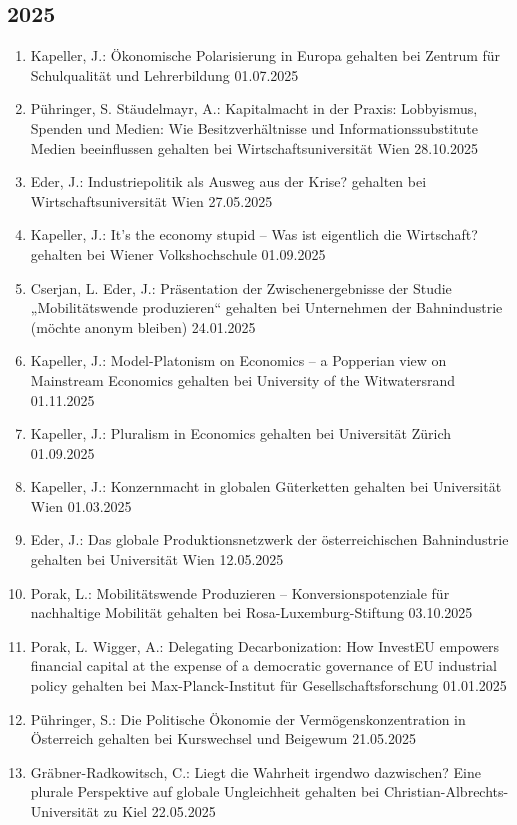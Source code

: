 \subsection*{2025}
\begin{enumerate}
	\item Kapeller, J.: Ökonomische Polarisierung in Europa gehalten bei Zentrum für Schulqualität und Lehrerbildung 01.07.2025
	\item Pühringer, S. Stäudelmayr, A.: Kapitalmacht in der Praxis: Lobbyismus, Spenden und Medien: Wie Besitzverhältnisse und Informationssubstitute Medien beeinflussen gehalten bei Wirtschaftsuniversität Wien 28.10.2025
	\item Eder, J.: Industriepolitik als Ausweg aus der Krise? gehalten bei Wirtschaftsuniversität Wien 27.05.2025
	\item Kapeller, J.: It’s the economy stupid – Was ist eigentlich die Wirtschaft? gehalten bei Wiener Volkshochschule 01.09.2025
	\item Cserjan, L. Eder, J.: Präsentation der Zwischenergebnisse der Studie „Mobilitätswende produzieren“ gehalten bei Unternehmen der Bahnindustrie (möchte anonym bleiben) 24.01.2025
	\item Kapeller, J.: Model-Platonism on Economics – a Popperian view on Mainstream Economics gehalten bei University of the Witwatersrand 01.11.2025
	\item Kapeller, J.: Pluralism in Economics gehalten bei Universität Zürich 01.09.2025
	\item Kapeller, J.: Konzernmacht in globalen Güterketten gehalten bei Universität Wien 01.03.2025
	\item Eder, J.: Das globale Produktionsnetzwerk der österreichischen Bahnindustrie gehalten bei Universität Wien 12.05.2025
	\item Porak, L.: Mobilitätswende Produzieren -- Konversionspotenziale für nachhaltige Mobilität gehalten bei Rosa-Luxemburg-Stiftung 03.10.2025
	\item Porak, L. Wigger, A.: Delegating Decarbonization: How InvestEU empowers financial capital at the expense of a democratic governance of EU industrial policy gehalten bei Max-Planck-Institut für Gesellschaftsforschung 01.01.2025
	\item Pühringer, S.: Die Politische Ökonomie der Vermögenskonzentration in Österreich gehalten bei Kurswechsel und Beigewum 21.05.2025
	\item Gräbner-Radkowitsch, C.: Liegt die Wahrheit irgendwo dazwischen? Eine plurale Perspektive auf globale Ungleichheit gehalten bei Christian-Albrechts-Universität zu Kiel 22.05.2025

\end{enumerate}
